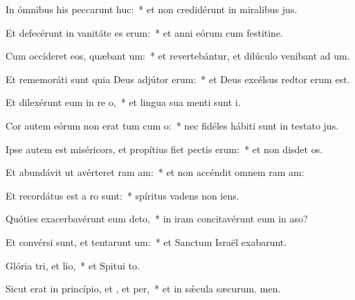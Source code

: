 \item In ómnibus his peccarunt huc:~* et non credidérunt in miralibus jus.
\item Et defecérunt in vanitáte es erum:~* et anni eórum cum festitine.
\item Cum occíderet eos, quæbant um:~* et revertebántur, et dilúculo venibant ad um.
\item Et rememoráti sunt quia Deus adjútor  erum:~* et Deus excélsus redtor erum est.
\item Et dilexérunt eum in re o,~* et lingua sua menti sunt i.
\item Cor autem eórum non erat tum cum o:~* nec fidéles hábiti sunt in testato jus.
\item Ipse autem est miséricors, et propítius fiet pectis erum:~* et non disdet os.
\item Et abundávit ut avérteret ram am:~* et non accéndit omnem ram am:
\item Et recordátus est a ro sunt:~* spíritus vadens  non iens.
\item Quóties exacerbavérunt eum  deto,~* in iram concitavérunt eum in aso?
\item Et convérsi sunt, et tentarunt um:~* et Sanctum Israël exabarunt.
\item Glória tri, et lio,~* et Spitui to.
\item Sicut erat in princípio, et , et per,~* et in sǽcula sæcurum. men.
